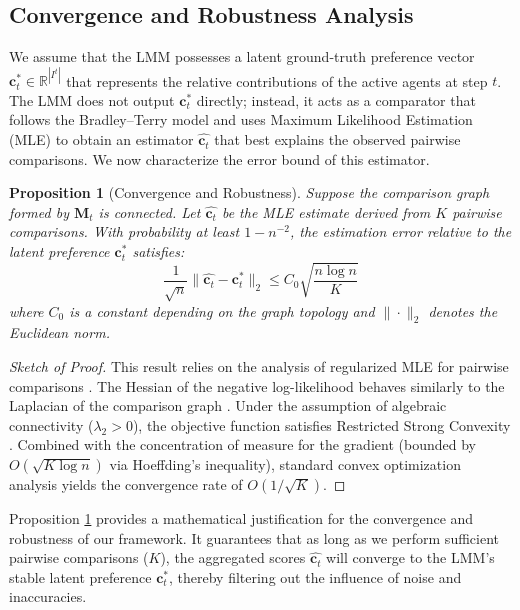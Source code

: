 \documentclass[11pt]{article}
\newtheorem{proposition}{Proposition}
\begin{document}
\subsection{Convergence and Robustness Analysis}
\label{subsec:robustness}

We assume that the LMM possesses a latent ground-truth preference vector $\mathbf{c}_t^* \in \mathbb{R}^{|I^t|}$ that represents the relative contributions of the active agents at step $t$. The LMM does not output $\mathbf{c}_t^*$ directly; instead, it acts as a comparator that follows the Bradley–Terry model and uses Maximum Likelihood Estimation (MLE) to obtain an estimator $\hat{\mathbf{c}_t}$ that best explains the observed pairwise comparisons. We now characterize the error bound of this estimator.

\begin{proposition}[Convergence and Robustness]
\label{pro:robustness}
Suppose the comparison graph formed by $\boldsymbol{M}_t$ is connected. Let $\hat{\mathbf{c}_t}$ be the MLE estimate derived from $K$ pairwise comparisons. With probability at least $1 - n^{-2}$, the estimation error relative to the latent preference $\mathbf{c}_t^*$ satisfies:
\begin{equation}
    \frac{1}{\sqrt{n}} \|\hat{\mathbf{c}_t} - \mathbf{c}_t^*\|_2 \le C_0 \sqrt{\frac{n \log n}{K}}
\end{equation}
where $C_0$ is a constant depending on the graph topology and $\|\cdot\|_2$ denotes the Euclidean norm.
\end{proposition}

\begin{proof}[Sketch of Proof]
This result relies on the analysis of regularized MLE for pairwise comparisons \cite{negahban2012iterative}. The Hessian of the negative log-likelihood behaves similarly to the Laplacian of the comparison graph \cite{shah2016estimation}. Under the assumption of algebraic connectivity ($\lambda_2 > 0$), the objective function satisfies Restricted Strong Convexity \cite{negahban2012unified}. Combined with the concentration of measure for the gradient (bounded by $O(\sqrt{K \log n})$ via Hoeffding's inequality), standard convex optimization analysis yields the convergence rate of $O(1/\sqrt{K})$.
\end{proof}

Proposition \ref{pro:robustness} provides a mathematical justification for the convergence and robustness of our framework. It guarantees that as long as we perform sufficient pairwise comparisons ($K$), the aggregated scores $\hat{\mathbf{c}_t}$ will converge to the LMM's stable latent preference $\mathbf{c}_t^*$, thereby filtering out the influence of noise and inaccuracies.
\end{document}
